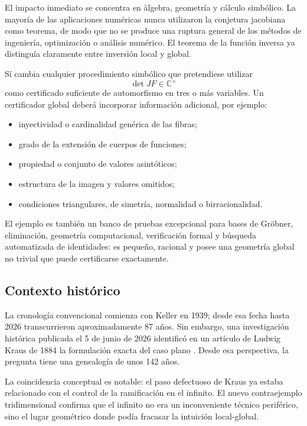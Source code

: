 \documentclass[11pt]{article}
\theoremstyle{definition}
\theoremstyle{remark}
\newcommand{\C}{\mathbb{C}}
\begin{document}
El impacto inmediato se concentra en \`algebra, geometr\'ia y c\'alculo
simb\'olico. La mayor\'ia de las aplicaciones num\'ericas nunca utilizaron la
conjetura jacobiana como teorema, de modo que no se produce una ruptura
general de los m\'etodos de ingenier\'ia, optimizaci\'on o an\'alisis num\'erico.
El teorema de la funci\'on inversa ya distingu\'ia claramente entre inversi\'on
local y global.

S\'i cambia cualquier procedimiento simb\'olico que pretendiese utilizar
\[
\det JF\in\C^\times
\]
como certificado suficiente de automorfismo en tres o m\'as variables. Un
certificador global deber\'a incorporar informaci\'on adicional, por ejemplo:
\begin{itemize}
\item inyectividad o cardinalidad gen\'erica de las fibras;
\item grado de la extensi\'on de cuerpos de funciones;
\item propiedad o conjunto de valores asint\'oticos;
\item estructura de la imagen y valores omitidos;
\item condiciones triangulares, de simetr\'ia, normalidad o birracionalidad.
\end{itemize}

El ejemplo es tambi\'en un banco de pruebas excepcional para bases de
Gr\"obner, eliminaci\'on, geometr\'ia computacional, verificaci\'on formal y
b\'usqueda automatizada de identidades: es peque\~no, racional y posee una
geometr\'ia global no trivial que puede certificarse exactamente.

\subsection{Contexto hist\'orico}

La cronolog\'ia convencional comienza con Keller en 1939; desde esa fecha hasta
2026 transcurrieron aproximadamente 87 a\~nos. Sin embargo, una investigaci\'on
hist\'orica publicada el 5 de junio de 2026 identific\'o en un art\'iculo de
Ludwig Kraus de 1884 la formulaci\'on exacta del caso plano
\cite{RodriguezDiaz2026}. Desde esa perspectiva, la pregunta tiene una
genealog\'ia de unos 142 a\~nos.

La coincidencia conceptual es notable: el paso defectuoso de Kraus ya estaba
relacionado con el control de la ramificaci\'on en el infinito. El nuevo
contraejemplo tridimensional confirma que el infinito no era un inconveniente
t\'ecnico perif\'erico, sino el lugar geom\'etrico donde pod\'ia fracasar la
intuici\'on local-global.
\end{document}
